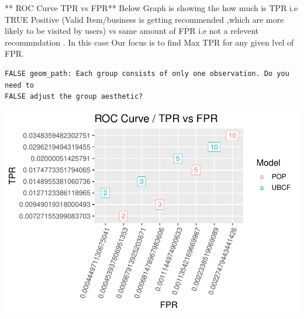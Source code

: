 \documentclass[]{article}
\newenvironment{Shaded}{\begin{snugshade}}{\end{snugshade}}
\newcommand{\DataTypeTok}[1]{\textcolor[rgb]{0.13,0.29,0.53}{#1}}
\newcommand{\DecValTok}[1]{\textcolor[rgb]{0.00,0.00,0.81}{#1}}
\newcommand{\KeywordTok}[1]{\textcolor[rgb]{0.13,0.29,0.53}{\textbf{#1}}}
\newcommand{\NormalTok}[1]{#1}
\newcommand{\OperatorTok}[1]{\textcolor[rgb]{0.81,0.36,0.00}{\textbf{#1}}}
\newcommand{\StringTok}[1]{\textcolor[rgb]{0.31,0.60,0.02}{#1}}
\begin{document}
** ROC Curve TPR vs FPR** Below Graph is showing the how much is TPR i.e
TRUE Positive (Valid Item/business is getting recommended ,which are
more likely to be visited by users) vs same amount of FPR i.e not a
relevent recommndation . In this case Our focus is to find Max TPR for
any given lvel of FPR.

\begin{Shaded}
\end{Shaded}

\begin{verbatim}
FALSE geom_path: Each group consists of only one observation. Do you need to
FALSE adjust the group aesthetic?
\end{verbatim}

\includegraphics{report_files/figure-latex/unnamed-chunk-4-1.pdf}
\end{document}
